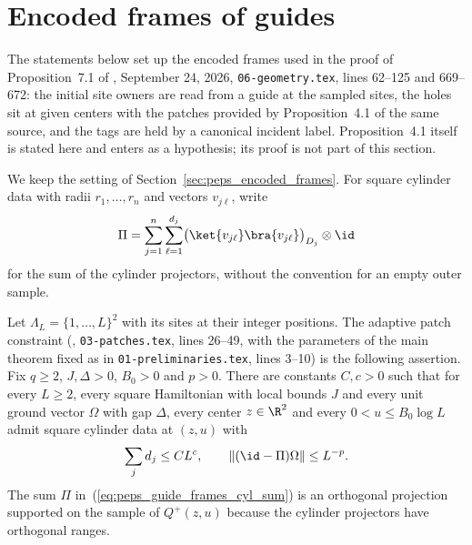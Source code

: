 \section{Encoded frames of guides}
\label{sec:peps_guide_frames}
The statements below set up the encoded frames used in the proof of
Proposition~7.1 of \cite{OpenAI2026PolynomialPEPS}, September 24, 2026,
\texttt{06-geometry.tex}, lines 62--125 and 669--672: the initial site owners are read
from a guide at the sampled sites, the holes sit at given centers with the
patches provided by Proposition~4.1 of the same source, and the tags are held by
a canonical incident label. Proposition~4.1 itself is stated here and enters as
a hypothesis; its proof is not part of this section.

We keep the setting of Section~\ref{sec:peps_encoded_frames}. For square cylinder
data with radii $r_1,\ldots,r_n$ and vectors $v_{j\ell}$, write
\begin{align}
    \Pi=\sum_{j=1}^{n}\sum_{\ell=1}^{d_j}
    \bigl(\ket{v_{j\ell}}\bra{v_{j\ell}}\bigr)_{D_j}\otimes\id
    \label{eq:peps_guide_frames_cyl_sum}
\end{align}
for the sum of the cylinder projectors, without the convention for an empty
outer sample.

\begin{definition}
    \label{def:peps_adaptive_patch_constraint}
    \leanok
    Let $\Lambda_L=\{1,\ldots,L\}^2$ with its sites at their integer positions.
    The adaptive patch constraint (\cite[Proposition~4.1]{OpenAI2026PolynomialPEPS},
    \texttt{03-patches.tex}, lines 26--49, with the parameters of the main
    theorem fixed as in \texttt{01-preliminaries.tex}, lines 3--10) is the following assertion. Fix $q\ge2$,
    $J,\Delta>0$, $B_0>0$ and $p>0$. There are constants $C,c>0$ such that for
    every $L\ge2$, every square Hamiltonian with local bounds $J$ and every
    unit ground vector $\Omega$ with gap $\Delta$, every center $z\in\R^2$ and
    every $0<u\le B_0\log L$ admit square cylinder data at $(z,u)$ with
    \begin{align}
        \sum_{j}d_j\le CL^c,
        \qquad
        \lVert(\id-\Pi)\Omega\rVert\le L^{-p}.
        \label{eq:peps_adaptive_patch_constraint}
    \end{align}
    The sum
    $\Pi$ in~(\ref{eq:peps_guide_frames_cyl_sum}) is an orthogonal projection supported on the sample of $Q^+(z,u)$ because the cylinder projectors have orthogonal ranges.
\end{definition}

